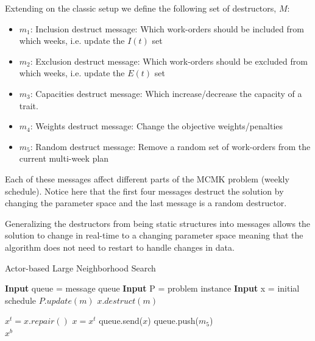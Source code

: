 \documentclass[preprint,12pt,authoryear]{elsarticle}
\begin{document}
Extending on the classic setup we define the following set of destructors, $M$:

\begin{itemize}
	\item $m_1$: Inclusion destruct message: Which work-orders should be included from which weeks, i.e. update the $I(t)$ set
	\item $m_2$: Exclusion destruct message: Which work-orders should be excluded from which weeks, i.e. update the $E(t)$ set
	\item $m_3$: Capacities destruct message: Which increase/decrease the capacity of a trait.
	\item $m_4$: Weights destruct message: Change the objective weights/penalties
	\item $m_5$: Random destruct message: Remove a random set of work-orders from the current multi-week plan
\end{itemize}

Each of these messages affect different parts of the MCMK problem (weekly schedule). Notice here that the first four messages destruct the solution by changing the parameter space and the last message is a random destructor.

Generalizing the destructors from being static structures into messages allows the solution to change in real-time to a changing parameter space meaning that the algorithm does not need to restart to handle changes in data. 

\begin{algorithm}[H]
\caption{Actor-based Large Neighborhood Search}  \label{algo1}
\begin{algorithmic}[1]
\State \textbf{Input} queue = message queue
\State \textbf{Input} P     = problem instance
\State \textbf{Input} x     = initial schedule
		\State $P.update(m)$
        \State $x.destruct(m)$
    \EndWhile
	
    \State $x^t = x.repair()$
                                 \label{alg:objective_start}
        \State $x = x^t$
		\State queue.send($x$)
    \EndIf                                           \label{alg:objective_end}
	\State queue.push($m_5$)
\EndWhile\\
\Return $x^b$
\end{algorithmic}
\end{algorithm}
\end{document}
